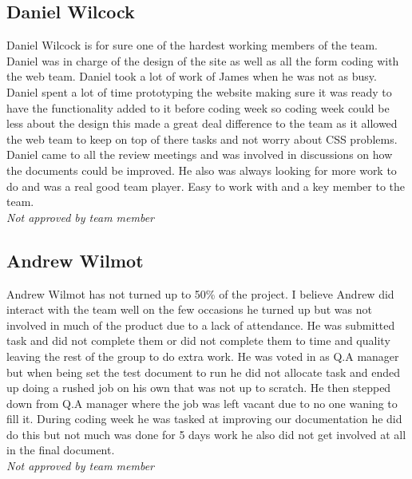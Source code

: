 \subsection{Daniel Wilcock}
    Daniel Wilcock is for sure one of the hardest working members of the team. Daniel was in charge of the design of the site as well as all the form coding with the web team. Daniel took a lot of work of James when he was not as busy. Daniel spent a lot of time prototyping the website making sure it was ready to have the functionality added to it before coding week so coding week could be less about the design this made a great deal difference to the team as it allowed the web team to keep on top of there tasks and not worry about CSS problems.
    Daniel came to all the review meetings and was involved in discussions on how the documents could be improved. He also was always looking for more work to do and was a real good team player. Easy to work with and a key member to the team.\\
    \emph{Not approved by team member}

\subsection{Andrew Wilmot}
    Andrew Wilmot has not turned up to 50\% of the project. I believe Andrew did interact with the team well on the few occasions he turned up but was not involved in much of the product due to a lack of attendance. He was submitted task and did not complete them or did not complete them to time and quality leaving the rest of the group to do extra work. He was voted in as Q.A manager but when being set the test document to run he did not allocate task and ended up doing a rushed job on his own that was not up to scratch. He then stepped down from Q.A manager where the job was left vacant due to no one waning to fill it. During coding week he was tasked at improving our documentation he did do this but not much was done for 5 days work he also did not get involved at all in the final document.\\
    \emph{Not approved by team member}
